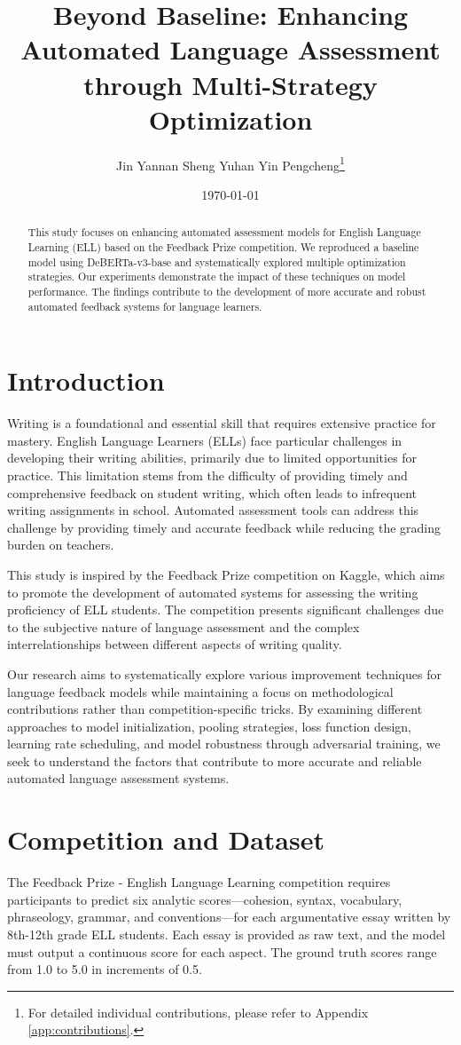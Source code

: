 \documentclass[12pt]{article}
\title{Beyond Baseline: Enhancing Automated Language Assessment through Multi-Strategy Optimization}
\author{Jin Yannan \quad Sheng Yuhan \quad Yin Pengcheng\protect\footnote{For detailed individual contributions, please refer to Appendix \ref{app:contributions}.}}
\date{\today}
\begin{document}
\maketitle

\begin{abstract}
This study focuses on enhancing automated assessment models for English Language Learning (ELL) based on the Feedback Prize competition. We reproduced a baseline model using DeBERTa-v3-base and systematically explored multiple optimization strategies. Our experiments demonstrate the impact of these techniques on model performance. The findings contribute to the development of more accurate and robust automated feedback systems for language learners.
\end{abstract}

\section{Introduction}

Writing is a foundational and essential skill that requires extensive practice for mastery. English Language Learners (ELLs) face particular challenges in developing their writing abilities, primarily due to limited opportunities for practice. This limitation stems from the difficulty of providing timely and comprehensive feedback on student writing, which often leads to infrequent writing assignments in school. Automated assessment tools can address this challenge by providing timely and accurate feedback while reducing the grading burden on teachers.

This study is inspired by the Feedback Prize competition on Kaggle, which aims to promote the development of automated systems for assessing the writing proficiency of ELL students. The competition presents significant challenges due to the subjective nature of language assessment and the complex interrelationships between different aspects of writing quality.

Our research aims to systematically explore various improvement techniques for language feedback models while maintaining a focus on methodological contributions rather than competition-specific tricks. By examining different approaches to model initialization,  pooling strategies, loss function design, learning rate scheduling, and model robustness through adversarial training, we seek to understand the factors that contribute to more accurate and reliable automated language assessment systems.

\section{Competition and Dataset}
The Feedback Prize - English Language Learning competition requires participants to predict six analytic scores—cohesion, syntax, vocabulary, phraseology, grammar, and conventions—for each argumentative essay written by 8th-12th grade ELL students. Each essay is provided as raw text, and the model must output a continuous score for each aspect. The ground truth scores range from 1.0 to 5.0 in increments of 0.5.
\end{document}
